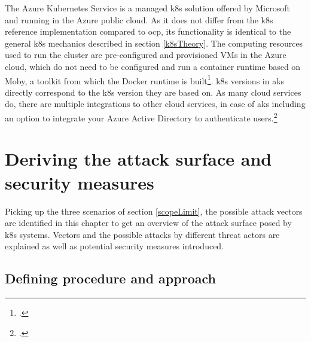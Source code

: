 The Azure Kubernetes Service is a managed \gls{k8s} solution offered by Microsoft and running in the Azure public cloud. 
As it does not differ from the \gls{k8s} reference implementation compared to \gls{ocp}, its functionality is identical to the general \gls{k8s} mechanics described in section \ref{k8sTheory}.
The computing resources used to run the cluster are pre-configured and provisioned VMs in the Azure cloud, which do not need to be configured and run a container runtime based on Moby, a toolkit from which the Docker runtime is built\footcite[][, section 'What is Moby?']{dockerMoby}.
\gls{k8s} versions in \gls{aks} directly correspond to the \gls{k8s} version they are based on.
As many cloud services do, there are multiple integrations to other cloud services, in case of \gls{aks} including an option to integrate your Azure Active Directory to authenticate users.\footcite[][, first paragraph]{aadAksAuth}


\chapter{Deriving the attack surface and security measures}

Picking up the three scenarios of section \ref{scopeLimit}, the possible attack vectors are  identified in this chapter to get an overview of the attack surface posed by \gls{k8s} systems. Vectors and the possible attacks by different threat actors are explained as well as potential security measures introduced.

\section{Defining procedure and approach}

